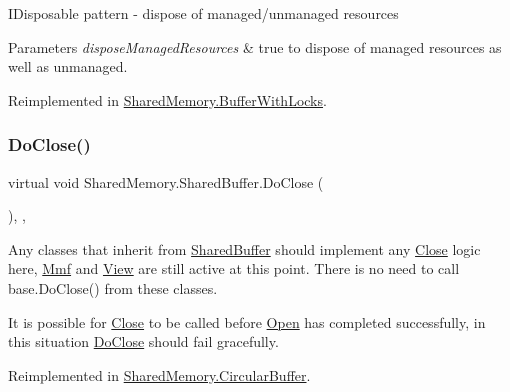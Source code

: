 I\+Disposable pattern -\/ dispose of managed/unmanaged resources 


\begin{DoxyParams}{Parameters}
{\em dispose\+Managed\+Resources} & true to dispose of managed resources as well as unmanaged.\\
\hline
\end{DoxyParams}


Reimplemented in \hyperlink{class_shared_memory_1_1_buffer_with_locks_a3b01026691fcd0c1b2088ebabb0780d4}{Shared\+Memory.\+Buffer\+With\+Locks}.

\mbox{\label{class_shared_memory_1_1_shared_buffer_a2137a67b3309712bc1e9a540c919f9bc}} 
\subsubsection{\texorpdfstring{Do\+Close()}{DoClose()}}
{\footnotesize\ttfamily virtual void Shared\+Memory.\+Shared\+Buffer.\+Do\+Close (\begin{DoxyParamCaption}{ }\end{DoxyParamCaption})\hspace{0.3cm}{\ttfamily [inline]}, {\ttfamily [protected]}, {\ttfamily [virtual]}}



Any classes that inherit from \hyperlink{class_shared_memory_1_1_shared_buffer}{Shared\+Buffer} should implement any \hyperlink{class_shared_memory_1_1_shared_buffer_a137e5d49a530fd990c6d22d30b92250a}{Close} logic here, \hyperlink{class_shared_memory_1_1_shared_buffer_a10466aaf4679f286101dfe69e187ca18}{Mmf} and \hyperlink{class_shared_memory_1_1_shared_buffer_a8ac57fdf6cb9e181d10f4af066f36d41}{View} are still active at this point. There is no need to call base.\+Do\+Close() from these classes. 

It is possible for \hyperlink{class_shared_memory_1_1_shared_buffer_a137e5d49a530fd990c6d22d30b92250a}{Close} to be called before \hyperlink{class_shared_memory_1_1_shared_buffer_abf7e37d0b654ad76bcfca63543766445}{Open} has completed successfully, in this situation \hyperlink{class_shared_memory_1_1_shared_buffer_a2137a67b3309712bc1e9a540c919f9bc}{Do\+Close} should fail gracefully.

Reimplemented in \hyperlink{class_shared_memory_1_1_circular_buffer_a29c1e46f0d8a3b95c83a361ac7f84194}{Shared\+Memory.\+Circular\+Buffer}.

